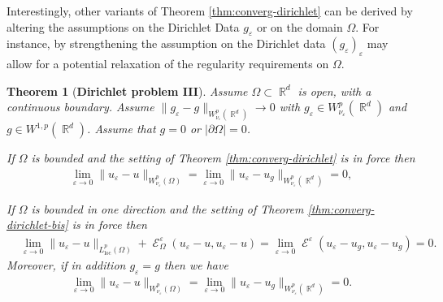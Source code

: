 \documentclass[12pt, reqno]{amsart}%
\theoremstyle{plain}  %
\newtheorem{theorem}{Theorem}[section]
\theoremstyle{definition}  %
\numberwithin{equation}{section}
\DeclareMathOperator{\loc}{loc}
\DeclareMathOperator{\cE}{\mathcal{E}}
\DeclareMathOperator{\R}{\mathbb{R}}
\newcommand{\eps}{\varepsilon}
\begin{document}
Interestingly, other variants of Theorem \ref{thm:converg-dirichlet} can be derived by altering the assumptions on the Dirichlet Data $g_\eps$ or on the domain $\Omega$. For instance, by strengthening the assumption on the Dirichlet data $(g_\eps)_\eps$ may allow for a potential relaxation of the regularity requirements on
$\Omega$.
\begin{theorem}[\textbf{Dirichlet problem III}]\label{thm:converg-dirichlet-3}
Assume $\Omega\subset \R^d$ is open,  with a continuous boundary. Assume $\|g_\eps-g\|_{W^p_{\nu_\eps}(\R^d)}\to0$ with $g_\eps\in  W^p_{\nu_\eps}(\R^d)$ and $g\in W^{1,p}(\R^d)$.  Assume that $g=0$ or  $|\partial\Omega|=0$.

\medskip
If $\Omega$ is bounded and the setting of Theorem \ref{thm:converg-dirichlet} is in force then
\begin{align*}
\lim_{\eps\to0}\|u_{\eps}-u\|_{W^p_{\nu_\eps}(\Omega)}= \lim_{\eps\to0}\|u_{\eps}-u_g\|_{W^p_{\nu_\eps}(\R^d)}=0,
\end{align*}

If $\Omega$ is bounded in one direction  and  the setting of Theorem \ref{thm:converg-dirichlet-bis} is in force then
\begin{align*}
&\lim_{\eps\to0}\|u_{\eps}-u\|_{L^p_{\loc}(\Omega)}+ \cE^\eps_\Omega(u_{\eps}-u,u_{\eps}-u)=\lim_{\eps\to0} \cE^\eps(u_{\eps}-u_g,u_{\eps}-u_g)= 0.
\end{align*}
Moreover, if in addition $g_\eps= g$ then we have
\begin{align*}
\lim_{\eps\to0}\|u_{\eps}-u\|_{W^p_{\nu_\eps}(\Omega)}
=\lim_{\eps\to0}\|u_{\eps}-u_g\|_{W^p_{\nu_\eps}
(\R^d)}=0.
\end{align*}
\end{theorem}
\end{document}
